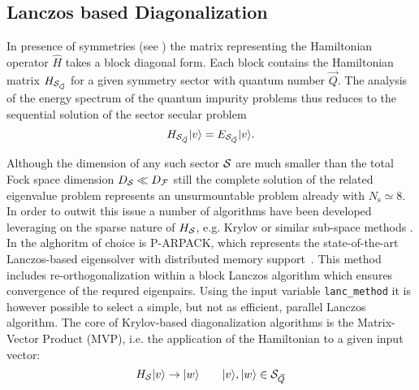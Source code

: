 \documentclass[edipack2.tex]{subfiles}
\begin{document}

\subsection{Lanczos based Diagonalization}\label{sSecHam}
In presence of symmetries (see ) the matrix representing
the Hamiltonian operator $\hat{H}$ takes a block diagonal form. Each block
contains the Hamiltonian matrix $H_{{\cal S}_{\vec{Q}}}$ for a
given symmetry sector with quantum number $\vec{Q}$.
The analysis of the energy spectrum of the quantum impurity problems
thus reduces to the sequential solution of the sector secular problem
$$
H_{{\cal S}_{\vec{Q}}}|v\rangle=E_{{\cal S}_{\vec{Q}}}|v\rangle.
$$

Although the dimension of any such sector ${\cal S}$ are much smaller than the
total Fock space dimension $D_{\cal S} \ll D_{\cal F}$ still the complete solution of
the related eigenvalue problem represents an unsurmountable problem
already with $N_\mathrm{s}\simeq 8$. 
In order to outwit this issue a number of
algorithms have been developed leveraging on the sparse nature of
$H_{\cal S}$, e.g. Krylov or similar sub-space methods \cite{Lanczos,Arnoldi,Feast}.   
In \NAME the alghoritm of choice is P-ARPACK, which represents the
state-of-the-art Lanczos-based eigensolver with distributed memory
support~\cite{P-Arpack}. This method includes re-orthogonalization
within a block Lanczos algorithm which ensures convergence of the
requred eigenpairs. Using the input variable {\tt lanc\_method} it is
however possible to select a simple, but not as efficient, parallel
Lanczos algorithm.
The core of Krylov-based diagonalization algorithms is the Matrix-Vector Product
(MVP), i.e. the application of the Hamiltonian to a given input
vector:
$$
H_{\cal S} |v\rangle \to |w\rangle\qquad |v\rangle,|w\rangle\in {\cal S}_{\vec{Q}}
$$
\end{document}
